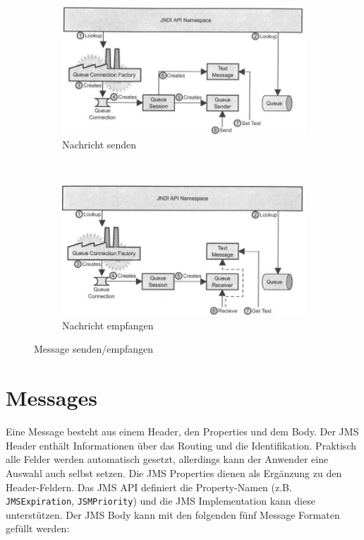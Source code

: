 \begin{figure}
	\centering
	\begin{subfigure}[b]{0.4\textwidth}
		\includegraphics[width=\textwidth]{fig/send-message}
		\caption{Nachricht senden}
	\end{subfigure}
	~
	\begin{subfigure}[b]{0.4\textwidth}
		\includegraphics[width=\textwidth]{fig/receive-message}
		\caption{Nachricht empfangen}
	\end{subfigure}
	\caption{Message senden/empfangen}
	\label{fig:send-receive-message}
\end{figure} 


\section{Messages}

Eine Message besteht aus einem Header, den Properties und dem Body. Der JMS Header enthält Informationen über das Routing und die Identifikation. Praktisch alle Felder werden automatisch gesetzt, allerdings kann der Anwender eine Auswahl auch selbst setzen. Die JMS Properties dienen als Ergänzung zu den Header-Feldern. Das JMS API definiert die Property-Namen (z.B. \verb|JMSExpiration|, \verb|JSMPriority|) und die JMS Implementation kann diese unterstützen. Der JMS Body kann mit den folgenden fünf Message Formaten gefüllt werden:

